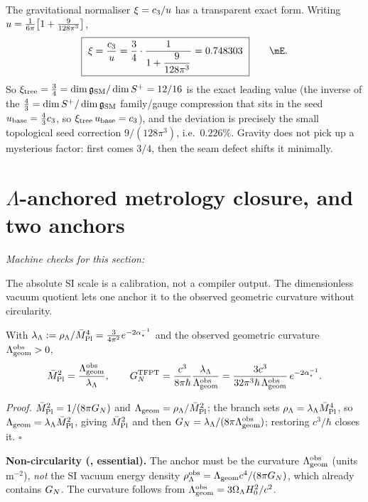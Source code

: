 The gravitational normaliser $\xi=c_3/u$ has a transparent exact form. Writing
$u=\tfrac{1}{6\pi}\bigl[1+\tfrac{9}{128\pi^3}\bigr]$,
\begin{equation}
  \boxed{\ \xi=\frac{\cthree}{\useed}=\frac34\cdot\frac{1}{1+\dfrac{9}{128\pi^3}}=0.748303\ }\qquad\mE .
\end{equation}
So $\xi_{\mathrm{tree}}=\tfrac34=\dim\mathfrak g_{\mathrm{SM}}/\dim S^+=12/16$ is the exact leading value (the inverse of the
$\tfrac43=\dim S^+/\dim\mathfrak g_{\mathrm{SM}}$ family/gauge compression that sits in the seed $u_{\mathrm{base}}=\tfrac43c_3$,
so $\xi_{\mathrm{tree}}\,u_{\mathrm{base}}=c_3$), and the
deviation is precisely the small topological seed correction $9/(128\pi^3)$, i.e.\ $0.226\%$.
Gravity does not pick up a mysterious factor: first comes $3/4$, then the seam defect shifts it
minimally.

\section{$\Lambda$-anchored metrology closure, and two anchors}
\noindent\emph{Machine checks for this section:} 


The absolute SI scale is a calibration, not a compiler output. The dimensionless vacuum quotient lets one
anchor it to the observed geometric curvature without circularity.

\begin{theorem}
With $\lambda_\Lambda:=\rho_\Lambda/\bar M_{\mathrm{Pl}}^4=\tfrac{3}{4\pi^2}e^{-2\alpha^{-1}_\star}$ and the observed geometric
curvature $\Lambda_{\mathrm{geom}}^{\mathrm{obs}}>0$,
\[
  \bar M_{\mathrm{Pl}}^2=\frac{\Lambda_{\mathrm{geom}}^{\mathrm{obs}}}{\lambda_\Lambda},\qquad
  G_N^{\mathrm{TFPT}}=\frac{c^3}{8\pi\hbar}\frac{\lambda_\Lambda}{\Lambda_{\mathrm{geom}}^{\mathrm{obs}}}
  =\frac{3c^3}{32\pi^3\hbar\,\Lambda_{\mathrm{geom}}^{\mathrm{obs}}}\,e^{-2\alpha^{-1}_\star}.
\]
\end{theorem}
\noindent\emph{Proof.} $\bar M_{\mathrm{Pl}}^2=1/(8\pi G_N)$ and $\Lambda_{\mathrm{geom}}=\rho_\Lambda/\bar M_{\mathrm{Pl}}^2$; the branch sets
$\rho_\Lambda=\lambda_\Lambda\bar M_{\mathrm{Pl}}^4$, so $\Lambda_{\mathrm{geom}}=\lambda_\Lambda\bar M_{\mathrm{Pl}}^2$, giving $\bar M_{\mathrm{Pl}}^2$ and
then $G_N=\lambda_\Lambda/(8\pi\Lambda_{\mathrm{geom}}^{\mathrm{obs}})$; restoring $c^3/\hbar$ closes it. $\square$

\par\smallskip\noindent\textbf{Non-circularity (\mO, essential).}
The anchor must be the curvature $\Lambda_{\mathrm{geom}}^{\mathrm{obs}}$ (units $\mathrm{m}^{-2}$), \emph{not} the
SI vacuum energy density $\rho_\Lambda^{\mathrm{obs}}=\Lambda_{\mathrm{geom}} c^4/(8\pi G_N)$, which already contains
$G_N$. The curvature follows from $\Lambda_{\mathrm{geom}}^{\mathrm{obs}}=3\Omega_\Lambda H_0^2/c^2$.
\par\smallskip

